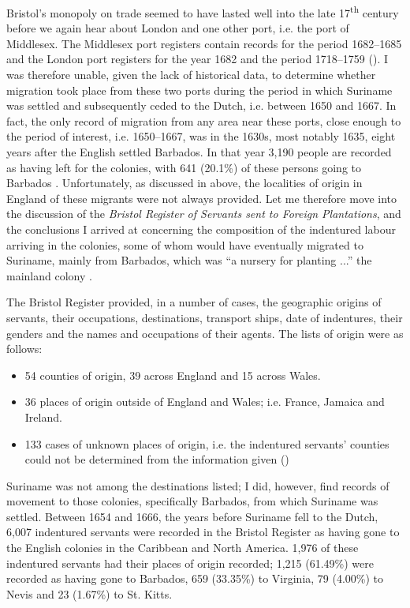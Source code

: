 Bristol's monopoly on trade seemed to have lasted well into the late 17\textsuperscript{th} century before we again hear about London and one other port, i.e. the port of Middlesex. The Middlesex port registers contain records for the period 1682--1685 and the London port registers for the year 1682 and the period 1718--1759 (\citeauthor{vcdhb}). I was therefore unable, given the lack of historical data, to determine whether migration took place from these two ports during the period in which Suriname was settled and subsequently ceded to the Dutch, i.e. between 1650 and 1667. In fact, the only record of migration from any area near these ports, close enough to the period of interest, i.e. 1650--1667, was in the 1630s, most notably 1635, eight years after the English settled Barbados. In that year 3,190 people are recorded as having left for the colonies, with 641 (20.1\%) of these persons going to Barbados \citep{Menard06}. Unfortunately, as discussed in  above, the localities of origin in England of these migrants were not always provided. Let me therefore move into the discussion of the \emph{Bristol Register of Servants sent to Foreign Plantations}, and the conclusions I arrived at concerning the composition of the indentured labour arriving in the colonies, some of whom would have eventually migrated to Suriname, mainly from Barbados, which was ``a nursery for planting ...'' the mainland colony \citep[no. 130]{Sainsbury80}.

The Bristol Register provided, in a number of cases, the geographic origins of servants, their occupations, destinations, transport ships, date of indentures, their genders and the names and occupations of their agents. The lists of origin were as follows:

\begin{itemize}
\item{54 counties of origin, 39 across England and 15 across Wales.}
\item{36 places of origin outside of England and Wales; i.e. France, Jamaica and Ireland.}
\item{133 cases of unknown places of origin, i.e. the indentured servants' counties could not be determined from the information given (\citeauthor{vcdh})}
\end{itemize}

Suriname was not among the destinations listed; I did, however, find records of movement to those colonies, specifically Barbados, from which Suriname was settled. Between 1654 and 1666, the years before Suriname fell to the Dutch, 6,007 indentured servants were recorded in the Bristol Register as having gone to the English colonies in the Caribbean and North America. 1,976 of these indentured servants had their places of origin recorded; 1,215 (61.49\%) were recorded as having gone to Barbados, 659 (33.35\%) to Virginia, 79 (4.00\%) to Nevis and 23 (1.67\%) to St. Kitts.


